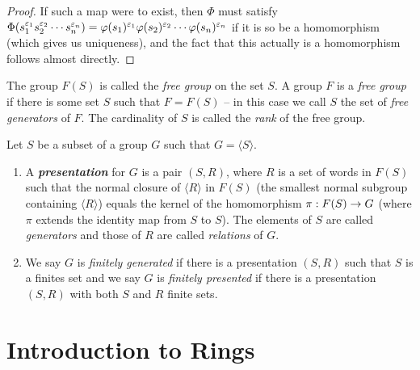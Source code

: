 \begin{proof}
If such a map were to exist, then $\Phi$ must satisfy $\Phi(s_1^{\varepsilon_1}s_2^{\varepsilon_2}\cdots s_n^{\varepsilon_n}) = \varphi(s_1)^{\varepsilon_1}\varphi(s_2)^{\varepsilon_2}\cdots \varphi(s_n)^{\varepsilon_n}$ if it is so be a homomorphism (which gives us uniqueness), and the fact that this actually is a homomorphism follows almost directly.
\end{proof}

\nl

\begin{defn}
The group $F(S)$ is called the \textit{free group} on the set $S$. A group $F$ is a \textit{free group} if there is some set $S$ such that $F= F(S)$ -- in this case we call $S$ the set of \textit{free generators} of $F$. The cardinality of $S$ is called the \textit{rank} of the free group.
\end{defn}

\nl

\begin{defn}
Let $S$ be a subset of a group $G$ such that $G = \langle S\rangle$.
\begin{enumerate}
\item A \textit{\textbf{presentation}} for $G$ is a pair $(S,R)$, where $R$ is a set of words in $F(S)$ such that the normal closure of $\langle R\rangle$ in $F(S)$ (the smallest normal subgroup containing $\langle R\rangle$) equals the kernel of the homomorphism $\pi:F(S)\rightarrow G$ (where $\pi$ extends the identity map from $S$ to $S$). The elements of $S$ are called \textit{generators} and those of $R$ are called \textit{relations} of $G$.
\item We say $G$ is \textit{finitely generated} if there is a presentation $(S,R)$ such that $S$ is a finites set and we say $G$ is \textit{finitely presented} if there is a presentation $(S,R)$ with both $S$ and $R$ finite sets.
\end{enumerate}
\end{defn}



\section{Introduction to Rings}

\setcounter{thm}{0}

